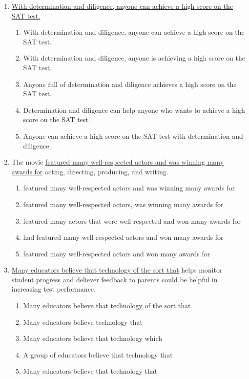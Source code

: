 \begin{enumerate}
\begin{enumerate}[label=(\Alph*)]
\end{enumerate}

\bigskip
\item \ul{With determination and diligence, anyone can achieve a high score on the SAT test.}

\bigskip
\begin{enumerate}[label=(\Alph*)]

\item With determination and diligence, anyone can achieve a high score on the SAT test. \hrulefill
\item With determination and diligence, anyone is achieving a high score on the SAT test.\hrulefill
\item Anyone full of determination and diligence achieves a high score on the SAT test.\hrulefill
\item Determination and diligence can help anyone who wants to achieve a high score on the SAT test. \hrulefill
\item Anyone can achieve a high score on the SAT test with determination and diligence.\hrulefill
\end{enumerate}

\bigskip
\item The movie \ul{featured many well-respected actors and was winning many awards for} acting, directing, producing, and writing. 

\bigskip
\begin{enumerate}[label=(\Alph*)]
\item featured many well-respected actors and was winning many awards for \hrulefill
\item featured many well-respected actors, was winning many awards for\hrulefill
\item featured many actors that were well-respected and won many awards for \hrulefill
\item had featured many well-respected actors and won many awards for\hrulefill
\item featured many well-respected actors and won many awards for \hrulefill
\end{enumerate}

\bigskip
\item \ul{Many educators believe that technology of the sort that} helps monitor student progress and deliever feedback to parents could be helpful in increasing test performance. 

\bigskip
\begin{enumerate}[label=(\Alph*)]
\item Many educators believe that technology of the sort that \hrulefill
\item Many educators believe technology that \hrulefill
\item Many educators believe that technology which \hrulefill
\item A group of educators believe that technology that \hrulefill
\item Many educators believe that technology that \hrulefill
\end{enumerate}


\end{enumerate}
